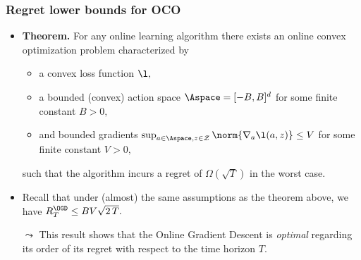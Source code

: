 \documentclass[11pt,compress,t,notes=noshow, xcolor=table]{beamer}
\begin{document}
\begin{frame}
%	
	\frametitle{Regret lower bounds for OCO}
	\small
	\begin{itemize}
		\item   \textbf{Theorem.} For any online learning algorithm there exists an online convex optimization problem characterized by
%		
		\begin{itemize}\small
			\item  a convex loss function $\l,$
			\pause
			\item  a  bounded (convex) action space  $\Aspace= [-B,B]^d$ for some finite constant $B>0,$
			\pause
			\item  and bounded gradients $\sup_{a\in \Aspace, z \in \Zspace}\norm{ \nabla_a \l(a,z) } \leq V$  for some finite constant $V>0,$
		\end{itemize}
%		
		\pause 
		such that the algorithm incurs a regret of $\Omega(\sqrt{T})$ in the worst case.
		\pause \item Recall that  under (almost) the same assumptions as the theorem above, we have $R_T^\OGD \leq   BV\sqrt{2\, T}.$ 
		\pause	\item [$\leadsto$] This result shows that the Online Gradient Descent 
		is \emph{optimal} regarding its order of its regret with respect to the time horizon $T.$  
%		
	\end{itemize}
\end{frame}



%
%

%
\endlecture
\end{document}
